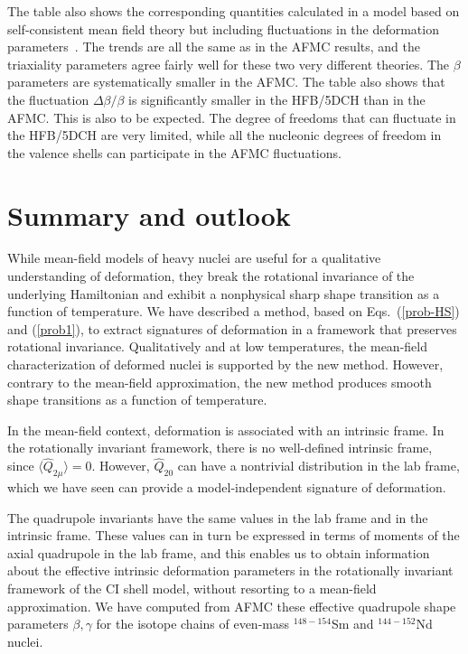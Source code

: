 \documentclass[prc,twocolumn,aps,showpacs,floatfix,nofootinbib,letterpaper,preprintnumbers]{revtex4-1}
\begin{document}
The table also shows the corresponding quantities calculated in a
model based on self-consistent mean field theory but including
fluctuations in the deformation parameters~\cite{de10}. The trends
are all the same as in the AFMC results, and the triaxiality parameters agree fairly well
for these two very different theories.  The $\beta$ parameters are
systematically smaller in the AFMC. The table also
shows that the
fluctuation $\Delta \beta /\beta$ is significantly smaller in the HFB/5DCH than
in the AFMC.  This is also to be expected.  The degree of
freedoms that can fluctuate in the HFB/5DCH are very limited, 
while all the nucleonic degrees of freedom in the valence 
shells can participate in the AFMC fluctuations.

\section{Summary and outlook}\label{summary}

While mean-field models of heavy nuclei are useful for a qualitative understanding of deformation, they break the rotational invariance of the underlying Hamiltonian and exhibit a nonphysical sharp shape transition as a function of temperature. We have described a method, based on Eqs.~(\ref{prob-HS}) and (\ref{prob1}), to extract signatures of deformation in a framework that preserves rotational invariance. Qualitatively and at low temperatures, the mean-field characterization of deformed nuclei is supported by the new method. However, contrary to the mean-field approximation, the new method produces smooth shape transitions as a function of temperature. 

In the mean-field context, deformation is associated with an intrinsic frame. In the rotationally invariant framework, there is no well-defined intrinsic frame, since $\langle \hat Q_{2\mu} \rangle = 0$. However, $\hat Q_{20}$ can have a nontrivial distribution in the lab frame, which we have seen can provide a model-independent signature of deformation.

The quadrupole invariants have the same values in the lab frame and in the intrinsic frame. These values can in turn be expressed in terms of moments of the axial quadrupole in the lab frame, and this enables us to obtain information about the effective intrinsic deformation parameters in the rotationally invariant framework of the CI shell model, without resorting to a mean-field approximation. We have computed from AFMC these effective quadrupole shape parameters $\beta,\gamma$ for the isotope chains of even-mass  $^{148-154}$Sm and $^{144-152}$Nd nuclei.
\end{document}
